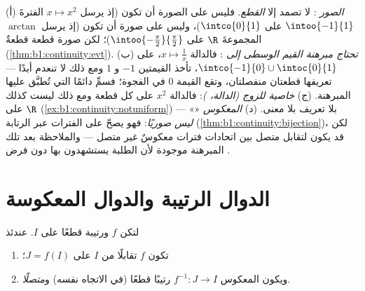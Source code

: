 \begin{remark}
(أ) \emph{الصور }: لا تصمد إلا \emph{القطع}.
فليس على الصورة    أن تكون 
(إذ يرسل $x \mapsto x^2$ الفترةَ $\intoo{-1}{1}$ على $\intco{0}{1}$)، وليس على
صورة  أن تكون  (إذ يرسل $\arctan$
المجموعةَ  $\R$ على 
$\intoo{-\frac\pi2}{\frac\pi2}$)؛ لكن صورة قطعة
قطعةٌ (\cref{thm:b1:continuity:evt}). (ب) \emph{تحتاج
مبرهنة القيم الوسطى إلى }: فالدالة $x
\mapsto \frac1x$،  على $\intco{-1}{0} \cup
\intoc{0}{1}$، تأخذ القيمتين $-1$ و $1$ ومع ذلك لا تنعدم
أبدًا ---  تعريفها قطعتان منفصلتان، وتقع القيمة
$0$ في الفجوة؛ فسمِّ دائمًا  التي تُطبَّق عليها
المبرهنة. (ج) \emph{ خاصية
للزوج (الدالة، )}: فالدالة $x^2$  على كل
قطعة ومع ذلك ليست كذلك على $\R$
(\cref{ex:b1:continuity:notuniform}) ---  «» بلا  تعريف بلا معنى. (د)
\emph{ المعكوس ليس صوريًا}: فهو يصحّ على
الفترات عبر الرتابة
(\cref{thm:b1:continuity:bijection})، لكن قد يكون لتقابل متصل
بين اتحادات فترات معكوسٌ غير متصل ---
والملاحظة بعد تلك المبرهنة موجودة لأن الطلبة يستشهدون بها
دون فرض .
\end{remark}

\section{الدوال الرتيبة والدوال المعكوسة}

\begin{theorem}\label{thm:b1:continuity:bijection}
لتكن $f$  ورتيبة قطعًا على  $I$. عندئذ
\begin{enumerate}
  \item تكون $f$ تقابلًا من $I$ على  $J = f(I)$؛
  \item ويكون المعكوس $f^{-1} \colon J \to I$ رتيبًا قطعًا (في
        الاتجاه نفسه) و\emph{متصلًا}.
\end{enumerate}
\end{theorem}

